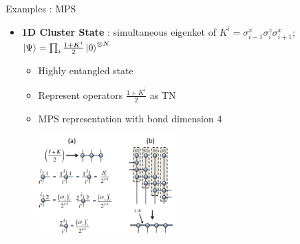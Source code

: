 \documentclass{beamer}
\begin{document}
\begin{frame}{Examples : MPS}
	\begin{itemize}
	\item \textbf{1D Cluster State} : simultaneous eigenket of ${ K^{i}=\sigma ^{x}_{i-1}\sigma ^{z}_{i}\sigma ^{x}_{i+1} }$; ${ \ket{\Psi }=\prod_i \frac{ 1+K^{i}}{2} \ket{0}^{\otimes N}}$
		\begin{itemize}
		\item Highly entangled state
		\item Represent operators ${ \frac{1+K^{i}}{2} }$ as TN
		\item MPS representation with bond dimension 4
		\end{itemize}
\end{itemize}	
\begin{figure}[h]
\includegraphics[width=0.5\textwidth]{1dcluster}
\centering
\end{figure}

\end{frame}
\end{document}

